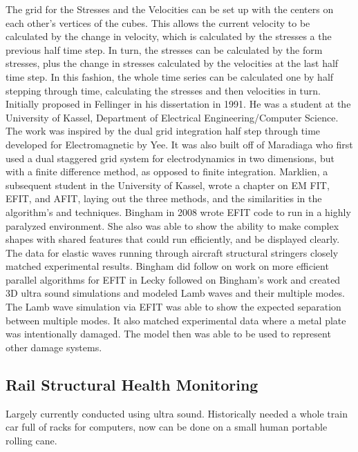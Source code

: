 \documentclass[journal=jacsat,manuscript=article]{achemso}
\begin{document}
The grid for the Stresses and the Velocities can be set up with the centers on each other’s vertices of the cubes.  This allows the current velocity to be calculated by the change in velocity, which is calculated by the stresses a the previous half time step.
In turn, the stresses can be calculated by the form stresses, plus the change in stresses calculated by the velocities at the last half time step.
In this fashion, the whole time series can be calculated one by half stepping through time, calculating the stresses and then velocities in turn.
Initially proposed in Fellinger \cite{fellinger_numerical_1995} in his dissertation in 1991.  He was a student at the University of Kassel, Department of Electrical Engineering/Computer Science.  The work was inspired by the dual grid integration half step through time developed for Electromagnetic by Yee\cite{kane_yee_numerical_1966}.  It was also built off of Maradiaga \cite{madariaga_dynamics_1976} who first used a dual staggered grid system for electrodynamics in two dimensions, but with a finite difference method, as opposed to finite integration.  Marklien, a subsequent student in the University of Kassel, wrote a chapter on EM FIT, EFIT, and AFIT\cite{marklein_11_nodate}, laying out the three methods, and the similarities in the algorithm’s and techniques.  
Bingham in 2008\cite{bingham_ultrasonic_2008} wrote EFIT code to run in a highly paralyzed environment.  She also was able to show the ability to make complex shapes with shared features that could run efficiently, and be displayed clearly.  The data for elastic waves running through aircraft structural stringers closely matched experimental results.  Bingham did follow on work on more efficient parallel algorithms for EFIT in
Lecky\cite{leckey_multiple-mode_2012} followed on Bingham’s work and created 3D ultra sound simulations and modeled Lamb waves and their multiple modes.  The Lamb wave simulation via EFIT was able to show the expected separation between multiple modes.  It also matched experimental data where a metal plate was intentionally damaged.  The model then was able to be used to represent other damage systems.


\subsection{Rail Structural Health Monitoring}
Largely currently conducted using ultra sound. Historically needed a whole train car full of racks for computers, now can be done on a small human portable rolling cane.
\end{document}
